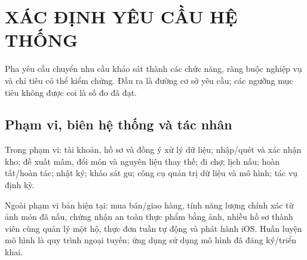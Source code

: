 \chapter{XÁC ĐỊNH YÊU CẦU HỆ THỐNG}
Pha yêu cầu chuyển nhu cầu khảo sát thành các chức năng, ràng buộc nghiệp vụ và chỉ tiêu có thể kiểm chứng. Đầu ra là đường cơ sở yêu cầu; các ngưỡng mục tiêu không được coi là số đo đã đạt.

\section{Phạm vi, biên hệ thống và tác nhân}
Trong phạm vi: tài khoản, hồ sơ và đồng ý xử lý dữ liệu; nhập/\allowbreak{}quét và xác nhận kho; đề xuất mâm, đổi món và nguyên liệu thay thế; đi chợ; lịch nấu; hoàn tất/\allowbreak{}hoàn tác; nhật ký; khảo sát gu; công cụ quản trị dữ liệu và mô hình; tác vụ định kỳ.

Ngoài phạm vi bản hiện tại: mua bán/\allowbreak{}giao hàng, tính năng lượng chính xác từ ảnh món đã nấu, chứng nhận an toàn thực phẩm bằng ảnh, nhiều hồ sơ thành viên cùng quản lý một hộ, thực đơn tuần tự động và phát hành iOS. Huấn luyện mô hình là quy trình ngoại tuyến; ứng dụng sử dụng mô hình đã đăng ký/\allowbreak{}triển khai.

